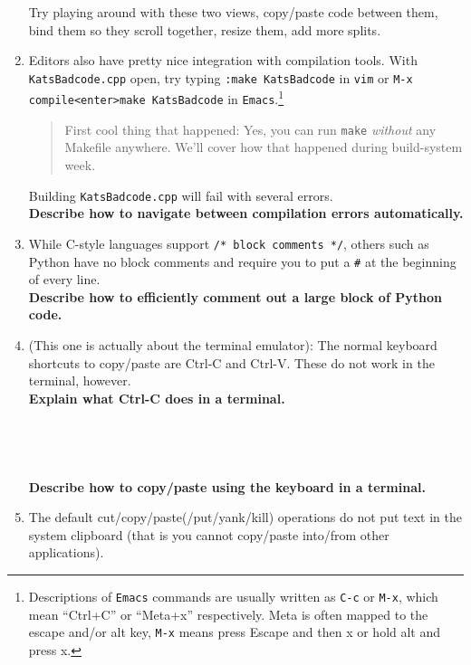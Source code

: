 \documentclass{article}
\begin{document}
\begin{enumerate}
    Try playing around with these two views, copy/paste code between them,
    bind them so they scroll together, resize them, add more splits.\\
  \item Editors also have pretty nice integration with compilation tools. With
    \texttt{KatsBadcode.cpp} open, try typing \texttt{:make KatsBadcode} in
    \texttt{vim} or \texttt{M-x compile<enter>make KatsBadcode} in
    \texttt{Emacs}.\footnote{
      Descriptions of \texttt{Emacs} commands are usually written as
      \texttt{C-c} or \texttt{M-x}, which mean ``Ctrl+C'' or ``Meta+x''
      respectively. Meta is often mapped to the escape and/or alt key,
      \texttt{M-x} means press Escape and then x or hold alt and press x.
    }
    \begin{quote}
      First cool thing that happened: Yes, you can run \texttt{make}
      \emph{without} any Makefile anywhere. We'll cover how that happened
      during build-system week.
    \end{quote}
    Building \texttt{KatsBadcode.cpp} will fail with several errors.\\
    \textbf{Describe how to navigate between compilation errors automatically.}
    \vspace{4em}
  \item While C-style languages support \texttt{/* block comments */}, others
    such as Python have no block comments and require you to put a \texttt{\#}
    at the beginning of every line.\\
    \textbf{Describe how to efficiently comment out a large block of Python code.}
    \vspace{4em}
  \item (This one is actually about the terminal emulator): The normal
    keyboard shortcuts to copy/paste are Ctrl-C and Ctrl-V. These do not work
    in the terminal, however.\\
    \textbf{Explain what Ctrl-C does in a terminal.}\\
    ~\\
    ~\\
    ~\\
    ~\\
    \textbf{Describe how to copy/paste using the keyboard in a terminal.}
    \vspace{4em}
  \item The default cut/copy/paste(/put/yank/kill) operations do not put text in
    the system clipboard (that is you cannot copy/paste into/from other
    applications).

\end{enumerate}
\end{document}
